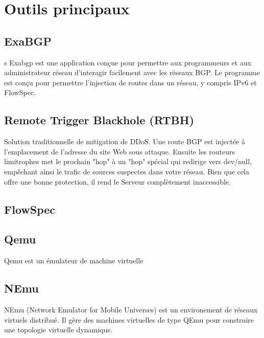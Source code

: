 \section{Outils principaux}

\subsection{ExaBGP}
s
Exabgp est une application conçue pour permettre aux programmeurs et aux administrateur réseau d’interagir facilement avec les réseaux BGP. Le programme est conçu pour permettre l’injection de routes dans un réseau, y compris IPv6 et FlowSpec.
\cite{Man10}

\subsection{Remote Trigger Blackhole (RTBH)}
Solution traditionnelle de mitigation de DDoS. 
Une route BGP est injectée à l'emplacement de l’adresse du site Web sous attaque. Ensuite les routeurs limitrophes  met le prochain "hop" à un "hop" spécial qui redirige vers dev/null, empêchant ainsi le trafic de sources suspectes dans votre réseau. Bien que cela offre une bonne protection, il rend le Serveur complètement inaccessible.





\subsection{FlowSpec}



\subsection{Qemu}

Qemu est un émulateur de machine virtuelle

\subsection{NEmu}
NEmu (Network Emulator for Mobile Universes) est un environement de réseaux virtuels distribué. Il gère des machines virtuelles de type QEmu pour construire une topologie virtuelle dynamique.


